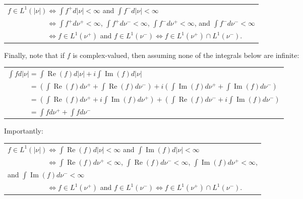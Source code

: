 \documentclass{book}
\newcommand{\exPP}{%
   \color{RedViolet}%
   \fontsize{12}{14}\selectfont%
}
\newenvironment{myIndent}{%
   \begin{adjustwidth}{2.5em}{0em}%
}{%
   \end{adjustwidth}%
}
\DeclareMathOperator{\rea}{Re}
\DeclareMathOperator{\ima}{Im}
\newcommand{\retTwo}{\hfill\bigbreak}
\begin{document}
\begin{enumerate}
\begin{myIndent}
		{\centering\exPP\begin{tabular}{l}
			$f \in L^1(|\nu|) \Longleftrightarrow \int f^+ d|\nu| < \infty$ and $\int f^- d|\nu| < \infty$ \\ [6pt]

			$\phantom{f \in L^1(|\nu|)} \Longleftrightarrow \int f^+ d\nu^+ < \infty$, $\int f^+ d\nu^- < \infty$, $\int f^- d\nu^+ < \infty$, and $\int f^- d\nu^- < \infty$\\ [6pt]

			$\phantom{f \in L^1(|\nu|)} \Longleftrightarrow f \in L^1(\nu^+)$ and $f \in L^1(\nu^-) \Longleftrightarrow f \in L^1(\nu^+) \cap L^1(\nu^-)$.
		\end{tabular} \retTwo\par}

		Finally, note that if $f$ is complex-valued, then assuming none of the integrals below are infinite:

		{\centering\exPP\begin{tabular}{l}
			$\int fd|\nu| = \int \rea(f)d|\nu| + i\int \ima(f)d|\nu|$\\ [6pt]
			
			$\phantom{\int fd|\nu|} = (\int \rea(f)d\nu^+ + \int \rea(f)d\nu^-) + i(\int \ima(f)d\nu^+ + \int \ima(f)d\nu^-) $\\ [6pt]

			$\phantom{\int fd|\nu|} =  (\int \rea(f) d\nu^+ + i\int \ima(f)d\nu^+) + (\int \rea(f) d\nu^- + i\int \ima(f)d\nu^-)$\\ [6pt]

			$\phantom{\int fd|\nu|} = \int f d\nu^+ + \int fd\nu^-$
		\end{tabular}\retTwo\par}

		Importantly:

		{\centering\exPP\begin{tabular}{l}
			$f \in L^1(|\nu|) \Longleftrightarrow \int \rea(f) d|\nu| < \infty$ and $\int \ima(f) d|\nu| < \infty$ \\ [6pt]

			$\phantom{f \in L^1(|\nu|)} \Longleftrightarrow \int \rea(f) d\nu^+ < \infty$, $\int \rea(f) d\nu^- < \infty$, $\int \ima(f) d\nu^+ < \infty$,\\
			
			\phantom{aaaaaaaaaaaaaaaaaaaaaaaaaaaaaaaaaaaaaaaaaaaaaaaaa} and $\int \ima(f) d\nu^- < \infty$\\ [6pt]

			$\phantom{f \in L^1(|\nu|)} \Longleftrightarrow f \in L^1(\nu^+)$ and $f \in L^1(\nu^-) \Longleftrightarrow f \in L^1(\nu^+) \cap L^1(\nu^-)$.
		\end{tabular} \newpage\par}


\end{myIndent}
\end{enumerate}
\end{document}
